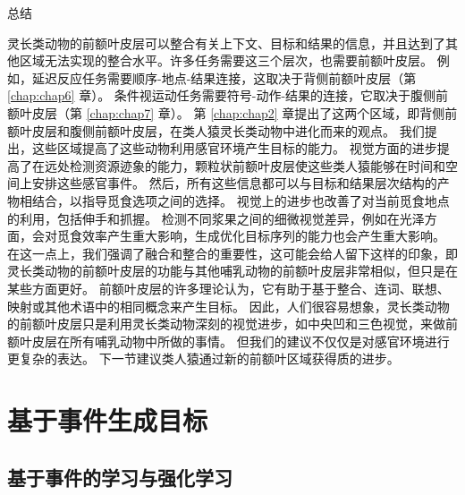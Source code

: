 总结

灵长类动物的前额叶皮层可以整合有关上下文、目标和结果的信息，并且达到了其他区域无法实现的整合水平。许多任务需要这三个层次，也需要前额叶皮层。
例如，延迟反应任务需要顺序-地点-结果连接，这取决于背侧前额叶皮层（第 \ref{chap:chap6} 章）。
条件视运动任务需要符号-动作-结果的连接，它取决于腹侧前额叶皮层（第 \ref{chap:chap7} 章）。
第 \ref{chap:chap2} 章提出了这两个区域，即背侧前额叶皮层和腹侧前额叶皮层，在类人猿灵长类动物中进化而来的观点。
我们提出，这些区域提高了这些动物利用感官环境产生目标的能力。
视觉方面的进步提高了在远处检测资源迹象的能力，颗粒状前额叶皮层使这些类人猿能够在时间和空间上安排这些感官事件。
然后，所有这些信息都可以与目标和结果层次结构的产物相结合，以指导觅食选项之间的选择。
视觉上的进步也改善了对当前觅食地点的利用，包括伸手和抓握。
检测不同浆果之间的细微视觉差异，例如在光泽方面，会对觅食效率产生重大影响，生成优化目标序列的能力也会产生重大影响。
在这一点上，我们强调了融合和整合的重要性，这可能会给人留下这样的印象，即灵长类动物的前额叶皮层的功能与其他哺乳动物的前额叶皮层非常相似，但只是在某些方面更好。
前额叶皮层的许多理论认为，它有助于基于整合、连词、联想、映射或其他术语中的相同概念来产生目标。
因此，人们很容易想象，灵长类动物的前额叶皮层只是利用灵长类动物深刻的视觉进步，如中央凹和三色视觉，来做前额叶皮层在所有哺乳动物中所做的事情。
但我们的建议不仅仅是对感官环境进行更复杂的表达。
下一节建议类人猿通过新的前额叶区域获得质的进步。



\section{基于事件生成目标}

\subsection{基于事件的学习与强化学习}

